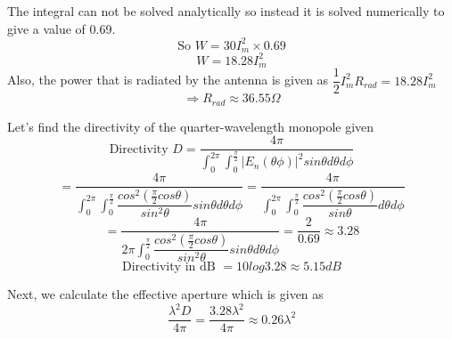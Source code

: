The integral can not be solved analytically so instead it is solved numerically to give a value of 0.69.
\[ \text{So } W = 30I_m^2 \times 0.69 \]
\begin{equation}
W = 18.28I_m^2
\end{equation}
Also, the power that is radiated by the antenna is given as $\dfrac{1}{2}I_m^2 R_{rad} = 18.28I_m^2$
\[ \Rightarrow R_{rad} \approx 36.55\Omega \]

Let's find the directivity of the quarter-wavelength monopole given 
\[ \text{Directivity }D = \dfrac{4\pi}{\int_{0}^{2\pi}\int_{0}^{\frac{\pi}{2}}|E_n(\theta\phi)|^2sin\theta d\theta d\phi} \]
\[ = \dfrac{4\pi}{\int_{0}^{2\pi}\int_{0}^{\frac{\pi}{2}}\dfrac{cos^2(\frac{\pi}{2}cos\theta)}{sin^2\theta}sin\theta d\theta d\phi} = \dfrac{4\pi}{\int_{0}^{2\pi}\int_{0}^{\frac{\pi}{2}}\dfrac{cos^2(\frac{\pi}{2}cos\theta)}{sin\theta} d\theta d\phi} \]
\[ = \dfrac{4\pi}{2\pi\int_{0}^{\frac{\pi}{2}}\dfrac{cos^2(\frac{\pi}{2}cos\theta)}{sin^2\theta}sin\theta d\theta d\phi} = \dfrac{2}{0.69} \approx 3.28 \]
\[ \text{Directivity in dB } = 10log3.28 \approx 5.15dB \]

Next, we calculate the effective aperture which is given as 
\[ \dfrac{\lambda^2 D}{4\pi} = \dfrac{3.28\lambda^2}{4\pi} \approx 0.26\lambda^2 \]

